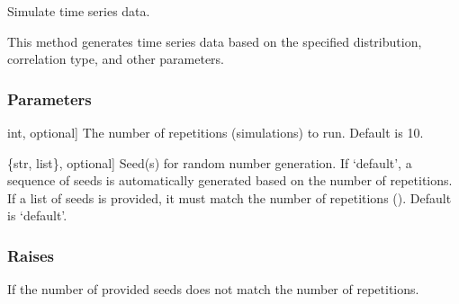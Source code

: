 \documentclass[a4paper,11pt,openany,english]{sphinxmanual}
\begin{document}
\begin{fulllineitems}
\begin{fulllineitems}
\label{\detokenize{api_topt:xtremes.topt.TimeSeries.simulate}}
\pysigstartsignatures
{}
\pysigstopsignatures
\sphinxAtStartPar
Simulate time series data.

\sphinxAtStartPar
This method generates time series data based on the specified distribution, correlation type, and other parameters.


\subsubsection{Parameters}
\label{\detokenize{api_topt:id6}}\begin{description}
\sphinxlineitem{rep}{[}int, optional{]}
\sphinxAtStartPar
The number of repetitions (simulations) to run. Default is 10.

\sphinxlineitem{seeds}{[}\{str, list\}, optional{]}
\sphinxAtStartPar
Seed(s) for random number generation. If ‘default’, a sequence of seeds is automatically generated 
based on the number of repetitions. If a list of seeds is provided, it must match the number of 
repetitions (). Default is ‘default’.

\end{description}


\subsubsection{Raises}
\label{\detokenize{api_topt:raises}}\begin{description}
\sphinxAtStartPar
If the number of provided seeds does not match the number of repetitions.

\end{description}

\end{fulllineitems}


\end{fulllineitems}
\end{document}
